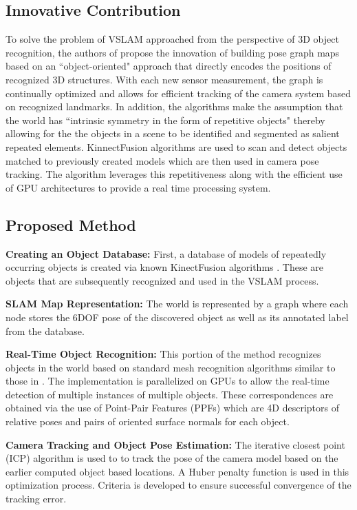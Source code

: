 \documentclass[10pt,twocolumn,letterpaper]{article}
\begin{document}
\subsection{Innovative Contribution}
To solve the problem of VSLAM approached from the perspective of 3D object recognition, the authors of \cite{Salas-Moreno_2013_CVPR} propose the innovation of building pose graph maps based on an ``object-oriented" approach that directly encodes the positions of recognized 3D structures. With each new sensor measurement, the graph is continually optimized and allows for efficient tracking of the camera system based on recognized landmarks. In addition, the algorithms make the assumption that the world has ``intrinsic symmetry in the form of repetitive objects" \cite{Salas-Moreno_2013_CVPR} thereby allowing for the the objects in a scene to be identified and segmented as salient repeated elements. KinnectFusion algorithms are used to scan and detect objects matched to previously created models which are then used in camera pose tracking. The algorithm leverages this repetitiveness along with the efficient use of GPU architectures to provide a real time processing system. 

\subsection{Proposed Method}
\textbf{Creating an Object Database:} First, a database of models of repeatedly occurring objects is created via known KinectFusion algorithms \cite{kf11}. 
These are objects that are subsequently recognized and used in the VSLAM process. 

\textbf{SLAM Map Representation:} The world is represented by a graph where each node stores the 6DOF 
pose of the discovered object as well as its annotated label from the database.

\textbf{Real-Time Object Recognition:} This portion of the method recognizes objects in the world based on standard mesh recognition algorithms similar to those in \cite{drost6}. The implementation is parallelized on GPUs to allow the real-time detection of multiple instances of multiple objects. These correspondences are obtained via the use of Point-Pair Features (PPFs) which are 4D descriptors of relative poses and pairs of oriented surface normals for each object. 

\textbf{Camera Tracking and Object Pose Estimation:} The iterative closest point (ICP) algorithm \cite{icp15} is used to to track the pose of the camera model based on the earlier computed object based locations. A Huber penalty function is used in this optimization process. Criteria is developed to ensure successful convergence of the tracking error.
\end{document}
